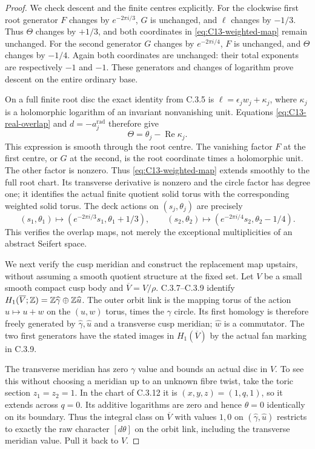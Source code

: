 \begin{proof}
We check descent and the finite centres explicitly. For the
clockwise first root generator $F$ changes by $e^{-2\pi i/3}$,
$G$ is unchanged, and $\ell$ changes by $-1/3$.
Thus $\Theta$ changes by $+1/3$, and both coordinates in
\eqref{eq:C13-weighted-map} remain unchanged. For the second
generator $G$ changes by $e^{-2\pi i/4}$, $F$ is unchanged,
and $\Theta$ changes by $-1/4$. Again both coordinates are
unchanged: their total exponents are respectively $-1$ and
$-1$. These generators and changes of logarithm prove descent
on the entire ordinary base.

On a full finite root disc the exact identity from C.3.5 is
$\ell=\epsilon_jw_j+\kappa_j$, where $\kappa_j$ is a
holomorphic logarithm of an invariant nonvanishing unit.
Equations \eqref{eq:C13-real-overlap} and $d=-a_j^{\mathrm{rad}}$ therefore give
\[
 \Theta=\theta_j-\operatorname{Re}\kappa_j.
\]
This expression is smooth through the root centre. The vanishing
factor $F$ at the first centre, or $G$ at the second, is the
root coordinate times a holomorphic unit. The other factor is
nonzero. Thus \eqref{eq:C13-weighted-map} extends smoothly to
the full root chart. Its transverse derivative is nonzero and
the circle factor has degree one; it identifies the actual
finite quotient solid torus with the corresponding weighted
solid torus. The deck actions on $(s_j,\theta_j)$ are precisely
\[
 (s_1,\theta_1)\mapsto(e^{-2\pi i/3}s_1,\theta_1+1/3),
 \qquad
 (s_2,\theta_2)\mapsto(e^{-2\pi i/4}s_2,\theta_2-1/4).
\]
This verifies the overlap maps, not merely the exceptional
multiplicities of an abstract Seifert space.

We next verify the cusp meridian and construct the replacement
map upstairs, without assuming a smooth quotient structure at
the fixed set. Let $V$ be a small smooth compact cusp body and
$\overline V=V/\rho$. C.3.7--C.3.9 identify
$H_1(\overline V;\mathbb Z)=\mathbb Z\widehat\gamma\oplus\mathbb Z\widehat u$.
The outer orbit link is the mapping torus of the action
$u\mapsto u+w$ on the $(u,w)$ torus, times the $\gamma$ circle.
Its first homology is therefore freely generated by
$\widehat\gamma,\widehat u$ and a transverse cusp meridian;
$\widehat w$ is a commutator. The two first generators have
the stated images in $H_1(\overline V)$ by the actual fan marking
in C.3.9.

The transverse meridian has zero $\gamma$ value and bounds
an actual disc in $V$. To see this without choosing a meridian
up to an unknown fibre twist, take the toric section
$z_1=z_2=1$. In the chart of C.3.12 it is
$(x,y,z)=(1,q,1)$, so it extends across $q=0$.
Its additive logarithms are zero and hence $\theta=0$
identically on its boundary. Thus the integral class on
$\overline V$ with values $1,0$ on
$(\widehat\gamma,\widehat u)$ restricts to exactly the raw
character $[d\theta]$ on the orbit link, including the transverse
meridian value. Pull it back to $V$.


\end{proof}
